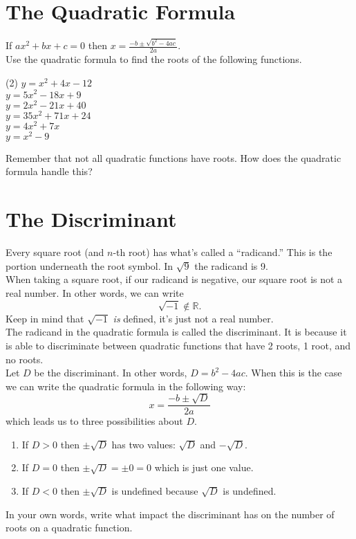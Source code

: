 \documentclass[12pt,fleqn]{book}
\begin{document}
\section*{The Quadratic Formula}
If $ax^2+bx+c=0$ then ${\displaystyle x=\frac{-b\pm \sqrt{b^2-4ac}}{2a}}$.
\\[1em]
Use the quadratic formula to find the roots of the following functions.
\begin{tasks}(2)
	\task$y = x^2 + 4x - 12$\\[2.5in]
	\task$y = 5x^2 -18 x + 9$\\[2.5in]
	\task$y = 2x^2 -21x + 40$\\[2.5in]
	\task$y = 35x^2 + 71x +24 $\\[2.5in]
	\task$y = 4x^2 + 7x $\\[2.5in]
	\task$y = x^2 - 9 $\\[2.5in]
\end{tasks}
Remember that not all quadratic functions have roots.  How does the quadratic formula handle this?
\section*{The Discriminant}
Every square root (and $n$-th root) has what's called a ``radicand.''  This is the portion underneath the root symbol.  In $\sqrt9$ the radicand is 9.
\\[1em]
When taking a square root, if our radicand is negative, our square root is not a real number.  In other words, we can write
\[\sqrt{-1}\not\in\mathbb R.\]
Keep in mind that $\sqrt{-1}$ \emph{is} defined, it's just not a real number.
\\[1em]
The radicand in the quadratic formula is called the discriminant.  It is because it is able to discriminate between quadratic functions that have 2 roots, 1 root, and no roots.
\\[1em]
Let $D$ be the discriminant.  In other words, $D=b^2-4ac$.  When this is the case we can write the quadratic formula in the following way:
\[x=\frac{-b\pm \sqrt{D}}{2a}\]
which leads us to three possibilities about $D$.
\begin{enumerate}
	\item If $D>0$ then $\pm \sqrt{D}$ has two values: $\sqrt D$ and $-\sqrt D$.
	\item If $D=0$ then $\pm \sqrt{D}=\pm 0 = 0$ which is just one value.
	\item If $D<0$ then $\pm \sqrt{D}$ is undefined because $\sqrt{D}$ is undefined.
\end{enumerate}
In your own words, write what impact the discriminant has on the number of roots on a quadratic function.
\end{document}
